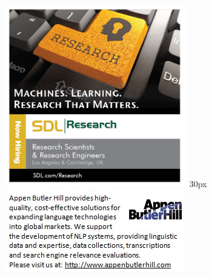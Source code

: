 \documentclass[twoside,makeidx]{book}
\begin{document}
\cleardoublepage
{}
\printindex

\includegraphics[height=300px]{ads/SDL_Research_Hire_Ad_4x4_Color.jpg}
\vfill{30px}
\includegraphics{ads/AppenButlerHill-gif.jpg}





\end{document}
